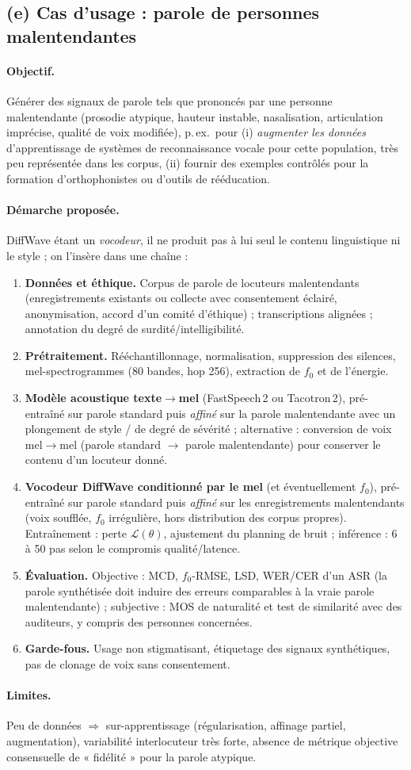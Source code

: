 \subsection{(e) Cas d'usage : parole de personnes malentendantes}
\paragraph{Objectif.} Générer des signaux de parole tels que prononcés par une personne malentendante (prosodie atypique, hauteur instable, nasalisation, articulation imprécise, qualité de voix modifiée), p.\,ex.\ pour (i) \emph{augmenter les données} d'apprentissage de systèmes de reconnaissance vocale pour cette population, très peu représentée dans les corpus, (ii) fournir des exemples contrôlés pour la formation d'orthophonistes ou d'outils de rééducation.

\paragraph{Démarche proposée.} DiffWave étant un \emph{vocodeur}, il ne produit pas à lui seul le contenu linguistique ni le style ; on l'insère dans une chaîne :
\begin{enumerate}
 \item \textbf{Données et éthique.} Corpus de parole de locuteurs malentendants (enregistrements existants ou collecte avec consentement éclairé, anonymisation, accord d'un comité d'éthique) ; transcriptions alignées ; annotation du degré de surdité/intelligibilité.
 \item \textbf{Prétraitement.} Rééchantillonnage, normalisation, suppression des silences, mel-spectrogrammes (80 bandes, hop 256), extraction de $f_0$ et de l'énergie.
 \item \textbf{Modèle acoustique texte$\to$mel} (FastSpeech\,2 ou Tacotron\,2), pré-entraîné sur parole standard puis \emph{affiné} sur la parole malentendante avec un plongement de style / de degré de sévérité ; alternative : conversion de voix mel$\to$mel (parole standard $\to$ parole malentendante) pour conserver le contenu d'un locuteur donné.
 \item \textbf{Vocodeur DiffWave conditionné par le mel} (et éventuellement $f_0$), pré-entraîné sur parole standard puis \emph{affiné} sur les enregistrements malentendants (voix soufflée, $f_0$ irrégulière, hors distribution des corpus propres). Entraînement : perte $\mathcal L(\theta)$, ajustement du planning de bruit ; inférence : 6 à 50 pas selon le compromis qualité/latence.
 \item \textbf{Évaluation.} Objective : MCD, $f_0$-RMSE, LSD, WER/CER d'un ASR (la parole synthétisée doit induire des erreurs comparables à la vraie parole malentendante) ; subjective : MOS de naturalité et test de similarité avec des auditeurs, y compris des personnes concernées.
 \item \textbf{Garde-fous.} Usage non stigmatisant, étiquetage des signaux synthétiques, pas de clonage de voix sans consentement.
\end{enumerate}
\paragraph{Limites.} Peu de données $\Rightarrow$ sur-apprentissage (régularisation, affinage partiel, augmentation), variabilité interlocuteur très forte, absence de métrique objective consensuelle de « fidélité » pour la parole atypique.
